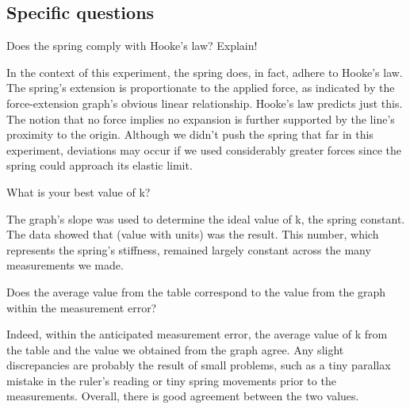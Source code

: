 \documentclass[a4paper, 10pt]{article}
\begin{document}
\begin{justify}
\subsection{Specific questions}
Does the spring comply with Hooke's law? Explain!
\par
In the context of this experiment, the spring does, in fact, adhere to Hooke's law. The spring's extension is proportionate to the applied force, as indicated by the force-extension graph's obvious linear relationship. Hooke's law predicts just this. The notion that no force implies no expansion is further supported by the line's proximity to the origin. Although we didn't push the spring that far in this experiment, deviations may occur if we used considerably greater forces since the spring could approach its elastic limit.
\par
What is your best value of k?
\par
The graph's slope was used to determine the ideal value of k, the spring constant. The data showed that (value with units) was the result. This number, which represents the spring's stiffness, remained largely constant across the many measurements we made.
\par
Does the average value from the table correspond to the value from the graph
within the measurement error?
\par
Indeed, within the anticipated measurement error, the average value of k from the table and the value we obtained from the graph agree. Any slight discrepancies are probably the result of small problems, such as a tiny parallax mistake in the ruler's reading or tiny spring movements prior to the measurements. Overall, there is good agreement between the two values.

\end{justify}
\end{document}

